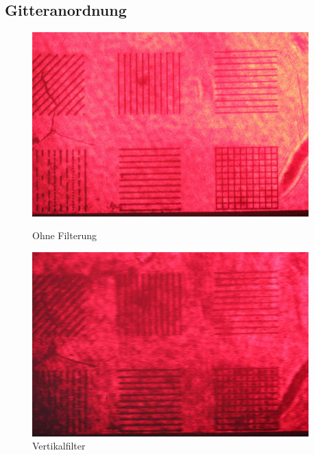         \subsection*{Gitteranordnung}
            \begin{figure}[H]
                  \begin{minipage}{0.33\textwidth}
                   \centering
                    \includegraphics[width=0.95\textwidth]{Abb/Abb_17.JPG}
                    \caption{Ohne Filterung}
                  \end{minipage}\hfill
                  \begin{minipage}{0.33\textwidth}
                   \centering
                    \includegraphics[width=0.95\textwidth]{Abb/Abb_18.JPG}
                    \caption{Vertikalfilter}
                  \end{minipage}\hfill
                  \begin{minipage}{0.33\textwidth}
                     \centering

\end{minipage}
\end{figure}
